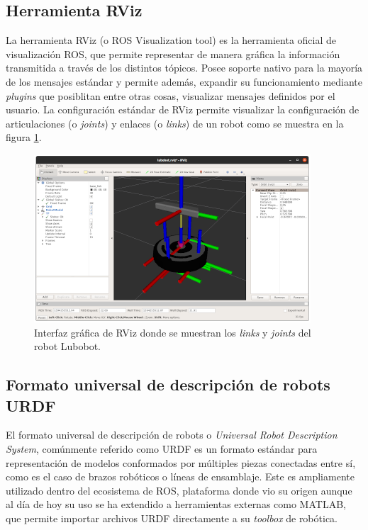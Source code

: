 \subsection{Herramienta RViz}

La herramienta RViz (o ROS Visualization tool) es la herramienta oficial de visualización ROS, que permite representar de manera gráfica la información transmitida a través de los distintos tópicos. Posee soporte nativo para la mayoría de los mensajes estándar y permite además, expandir su funcionamiento mediante \textit{plugins} que posiblitan entre otras cosas, visualizar mensajes definidos por el usuario. La configuración estándar de RViz permite visualizar la configuración de articulaciones (o \textit{joints}) y enlaces (o \textit{links}) de un robot como se muestra en la figura \ref{fig:rviz}.

\begin{figure}[ht]
    \centering
    \includegraphics{./Figures/rviz.png}
    \caption{Interfaz gráfica de RViz donde se muestran los \textit{links} y \textit{joints} del robot Lubobot.}
    \label{fig:rviz}
\end{figure}


\subsection{Formato universal de descripción de robots URDF}

El formato universal de descripción de robots o \textit{Universal Robot Description System}, comúnmente referido como URDF es un formato estándar para representación de modelos conformados por múltiples piezas conectadas entre sí, como es el caso de brazos robóticos o líneas de ensamblaje. Este es ampliamente utilizado dentro del ecosistema de ROS, plataforma donde vio su origen aunque al día de hoy su uso se ha extendido a herramientas externas como MATLAB, que permite importar archivos URDF directamente a su \textit{toolbox} de robótica.

